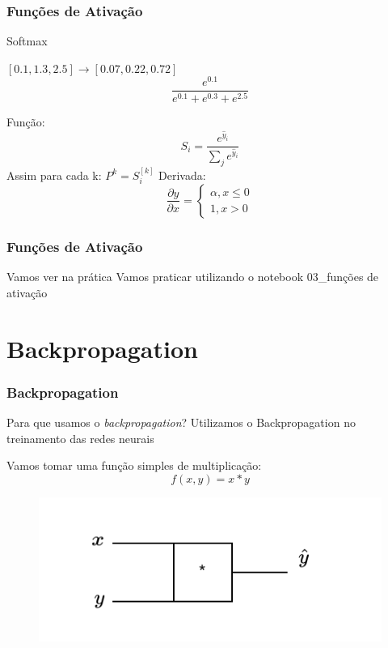 \documentclass{beamer}
\begin{document}
\begin{frame}
	\frametitle{Funções de Ativação}
	\begin{block}{Softmax}
		\begin{example}
			$[0.1, 1.3, 2.5] \to [0.07, 0.22, 0.72] $ \\
			$$\frac{e^{0.1}}{e^{0.1} + e^{0.3} + e^{2.5}}$$
		\end{example}
		Função:
		$$S_i = \frac{e^{\hat{y}_i}}{\sum_j e^{\hat{y}_i}} $$
		Assim para cada k: $P^k = S_i^{[k]}$
		Derivada: 	$$\frac{\partial y}{\partial x} =
		\left\{\begin{matrix}
			\alpha, x \leq 0
			\\ 
			1, x > 0
		\end{matrix}\right.$$
	\end{block}
\end{frame}
\begin{frame}
	\frametitle{Funções de Ativação}
	\begin{block}{Vamos ver na prática}
		Vamos praticar utilizando o notebook 03\_funções de ativação
	\end{block}
\end{frame}

\section{Backpropagation}
\begin{frame}
	\frametitle{Backpropagation}
	\begin{block}{Para que usamos o \textit{backpropagation}?}
		Utilizamos o Backpropagation no treinamento das redes neurais
	\end{block}
	\begin{example}
		Vamos tomar uma função simples de multiplicação:
		$$f(x, y) = x * y$$
			
		\begin{figure}
			\centering
			\includegraphics[width=0.5\linewidth]{figures/simple_multiply_gate}
		\end{figure}
	\end{example}
\end{frame}
\end{document}
